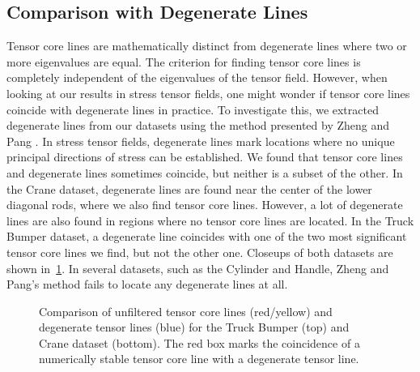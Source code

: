 \subsection{Comparison with Degenerate Lines} %
\label{sub:comparison_with_degenerate_lines}
%
Tensor core lines are mathematically distinct from degenerate lines where two or
more eigenvalues are equal.
%
The criterion for finding tensor core lines is completely independent of the
eigenvalues of the tensor field.
%
However, when looking at our results in stress tensor fields, one might wonder
if tensor core lines coincide with degenerate lines in practice.
%
To investigate this, we extracted degenerate lines from our datasets using the
method presented by Zheng and Pang \cite{Zheng2004}.
%
In stress tensor fields, degenerate lines mark locations where no unique
principal directions of stress can be established.
%
We found that tensor core lines and degenerate lines sometimes coincide, but
neither is a subset of the other.
%
In the Crane dataset, degenerate lines are found near the center of the lower
diagonal rods, where we also find tensor core lines.
%
However, a lot of degenerate lines are also found in regions where no tensor
core lines are located.
%
In the Truck Bumper dataset, a degenerate line coincides with one of the two
most significant tensor core lines we find, but not the other one.
%
Closeups of both datasets are shown in~\cref{fig:topo_comparison}.
%
In several datasets, such as the Cylinder and Handle, Zheng and Pang's method
fails to locate any degenerate lines at all.
%
\begin{figure}[t]
    \centering
    \setlength{\figurewidth}{0.8\textwidth}
    
    \caption{Comparison of unfiltered tensor core lines (red/yellow) and
    degenerate tensor lines (blue) for the Truck Bumper (top) and Crane dataset
    (bottom). The red box marks the coincidence of a numerically stable tensor
    core line with a degenerate tensor line.}
    \label{fig:topo_comparison}
\end{figure}
%
%
